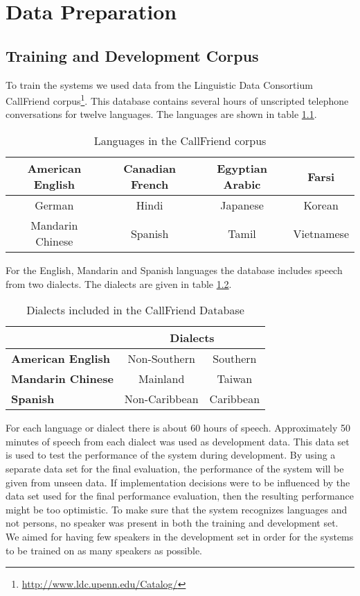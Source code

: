 \chapter{Data Preparation}

\section{Training and Development Corpus}

To train the systems we used data from the Linguistic Data Consortium CallFriend corpus\footnote{\url{http://www.ldc.upenn.edu/Catalog/}}. This database contains several hours of unscripted telephone conversations for twelve languages. The languages are shown in table \ref{tab:callfriend}.
\begin{table}[hbt]
	\begin{center}
	\caption{Languages in the CallFriend corpus}
	\begin{tabular}{ | c | c | c | c |}
	\hline
	American English & Canadian French & Egyptian Arabic & Farsi \\ \hline
	German & Hindi & Japanese & Korean \\ \hline
	Mandarin Chinese & Spanish & Tamil & Vietnamese \\ \hline
	\hline
	\end{tabular}
	\label{tab:callfriend}
	\end{center}
\end{table}
For the English, Mandarin and Spanish languages the database includes speech from two dialects. The dialects are given in table \ref{tab:callfrienddial}.
\begin{table}[hbt]
	\begin{center}
	\caption{Dialects included in the CallFriend Database}
	\begin{tabular}{| l | c | c |}
		\cline{2-3}
		\multicolumn{1}{l}{}  & \multicolumn{2}{|c|}{\textbf{Dialects}} \\ \hline
		\textbf{American English} & Non-Southern & Southern \\ \hline 
		\textbf{Mandarin Chinese} & Mainland & Taiwan \\ \hline 
		\textbf{Spanish} & Non-Caribbean & Caribbean \\
		\hline
	\end{tabular}
	\label{tab:callfrienddial}
	\end{center}
\end{table}	
For each language or dialect there is about 60 hours of speech. Approximately 50 minutes of speech from each dialect was used as development data. This data set is used to test the performance of the system during development. By using a separate data set for the final evaluation, the performance of the system will be given from unseen data. If implementation decisions were to be influenced by the data set used for the final performance evaluation, then the resulting performance might be too optimistic. To make sure that the system recognizes languages and not persons, no speaker was present in both the training and development set. We aimed for having few speakers in the development set in order for the systems to be trained on as many speakers as possible.

